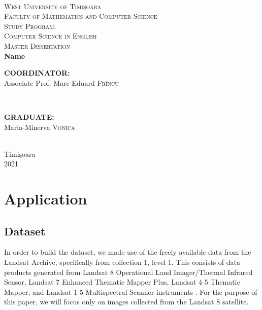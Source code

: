 \documentclass[11pt, a4paper]{report}
\begin{document}
	\begin{titlepage}
		
		\newcommand{\HRule}{\rule{\linewidth}{0.5mm}}
		
		\center
		
		\textsc{}\\[.7cm]
		
		\textsc{\LARGE West University of  Timi\c{s}oara}\\[0.5cm]
		\textsc{\Large Faculty of Mathematics and Computer Science}\\[0.5cm]
		\textsc{\large Study Program: \\Computer Science in English}\\[4.5cm]
		
		\textsc{\Huge Master Dissertation}\\[2cm]
		
		{\Huge \bfseries Name}\\[6cm]
		
		\begin{minipage}{0.4\textwidth}
			\begin{flushleft} \large
				\textbf{COORDINATOR:}\\
				Associate Prof. Marc Eduard \textsc{Frîncu}
			\end{flushleft}
		\end{minipage}
		~
		\begin{minipage}{0.4\textwidth}
			\begin{flushright} \large
				\textbf{GRADUATE:} \\
				Maria-Minerva \textsc{Vonica}
			\end{flushright}
		\end{minipage}\\[0.5cm]
		\vfill
		{\large Timi\c{s}oara\\ 2021}\\
		
		\vfill
		
	\end{titlepage}

	
	\chapter{Application}
	\section{Dataset}
	In order to build the dataset, we made use of the freely available data from the Landsat Archive, specifically from collection 1, level 1. This consists of data products generated from Landsat 8 Operational Land Imager/Thermal Infrared Sensor, Landsat 7 Enhanced Thematic Mapper Plus, Landsat 4-5 Thematic Mapper, and Landsat 1-5 Multispectral Scanner instruments \cite{C1L1}. For the purpose of this paper, we will focus only on images collected from the Landsat 8 satellite.
	
\end{document}
